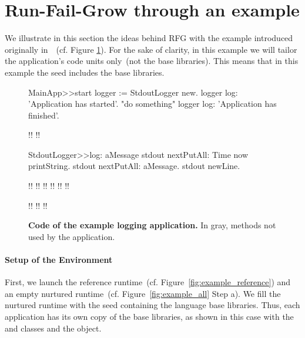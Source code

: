 

\section{Run-Fail-Grow through an example}\label{sec:rfg_example}
We illustrate in this section the ideas behind RFG with the example introduced originally in~~(cf. Figure \ref{fig:code_example_again}). For the sake of clarity, in this example we will tailor the application's code units only~(\ie not the base libraries). This means that in this example the seed includes the base libraries.

\begin{figure}[ht]
\begin{code}
MainApp>>start
    logger := StdoutLogger new.
    logger log: 'Application has started'.
    "do something"
    logger log: 'Application has finished'.

!!
!!

StdoutLogger>>log: aMessage
    stdout nextPutAll: Time now printString.
    stdout nextPutAll: aMessage.
    stdout newLine.
    
!!
!!
!!
!!
!!
!!

!!
!!
!!
\end{code}

\caption{ \small\textbf{Code of the example logging application.} In gray, methods not used by the application.\label{fig:code_example_again}}
\end{figure}


\paragraph{Setup of the Environment} First, we launch the reference runtime~(cf. Figure~\ref{fig:example_reference}) and an empty nurtured runtime~(cf. Figure~\ref{fig:example_all} Step a). We fill the nurtured runtime with the seed containing the language base libraries. Thus, each application has its own copy of the base libraries, as shown in this case with the  and  classes and the  object.

